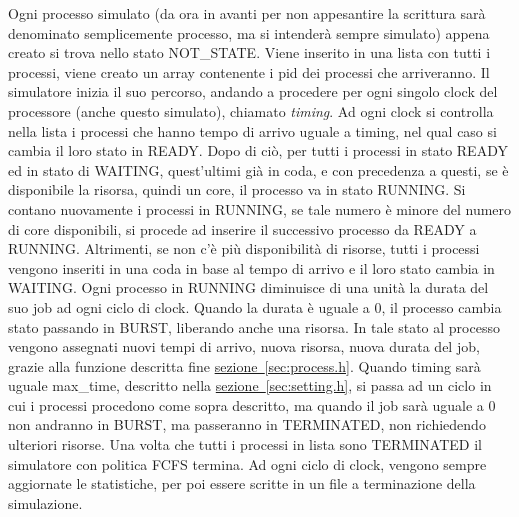 \documentclass[Lau, oneside]{sapthesis}%
\begin{document}
Ogni processo simulato (da ora in avanti per non appesantire la scrittura sarà denominato semplicemente processo, ma si intenderà sempre simulato) appena creato si trova nello stato NOT\_STATE.
Viene inserito in una lista con tutti i processi, viene creato un array contenente i pid dei processi che arriveranno.
Il simulatore inizia il suo percorso, andando a procedere per ogni singolo clock del processore (anche questo simulato), chiamato \textit{timing}.
Ad ogni clock si controlla nella lista i processi che hanno tempo di arrivo uguale a timing, nel qual caso si cambia il loro stato in READY.
Dopo di ciò, per tutti i processi in stato READY ed in stato di WAITING, quest'ultimi già in coda, e con precedenza a questi, se è disponibile la risorsa, quindi un core, il processo va in stato RUNNING.
Si contano nuovamente i processi in RUNNING, se tale numero è minore del numero di core disponibili, si procede ad inserire il successivo processo da READY a RUNNING.
Altrimenti, se non c'è più disponibilità di risorse, tutti i processi vengono inseriti in una coda in base al tempo di arrivo e il loro stato cambia in WAITING.
Ogni processo in RUNNING diminuisce di una unità la durata del suo job ad ogni ciclo di clock.
Quando la durata è uguale a 0, il processo cambia stato passando in BURST, liberando anche una risorsa.
In tale stato al processo vengono assegnati nuovi tempi di arrivo, nuova risorsa, nuova durata del job, grazie alla funzione descritta fine \hyperref[sec:process.h]{sezione~\ref*{sec:process.h}}.
Quando timing sarà uguale max\_time, descritto nella \hyperref[sec:setting.h]{sezione~\ref*{sec:setting.h}}, si passa ad un ciclo in cui i processi procedono come sopra descritto, ma quando il job sarà uguale a 0 non andranno in BURST, ma passeranno in TERMINATED, non richiedendo ulteriori risorse.
Una volta che tutti i processi in lista sono TERMINATED il simulatore con politica FCFS termina.
Ad ogni ciclo di clock, vengono sempre aggiornate le statistiche, per poi essere scritte in un file a terminazione della simulazione.
\end{document}
